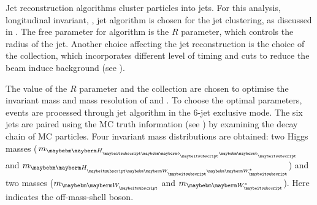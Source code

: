Jet reconstruction algorithms cluster particles into jets. For this analysis, longitudinal invariant, \kt, jet algorithm is chosen for the jet clustering, as discussed in . The free parameter for \kt algorithm is the $R$ parameter, which controls the radius of the jet. Another choice affecting the jet reconstruction is the choice of the \PFO collection, which incorporates different level of timing and \pT cuts to reduce the beam induce background (see ).

The value of the $R$ parameter and the \PFO collection are chosen to optimise the invariant mass and mass resolution of \PHiggs and \PW. To choose the optimal parameters, \eeToHHbbWWHad events  are processed through \kt jet algorithm  in the 6-jet exclusive mode. The six jets are paired using the MC truth information (see ) by examining the decay chain of MC particles. Four invariant mass distributions are obtained: two Higgs masses ($m_{\Hbb}$ and $m_{\HWW}$) and two \PW masses ($m_{\PW}$ and $m_{\W*}$). Here \W* indicates the off-mass-shell \PW boson.





